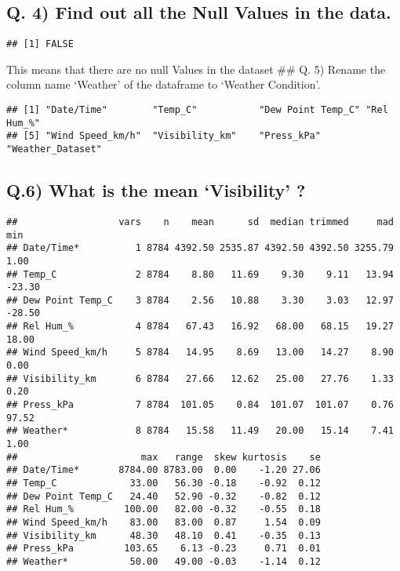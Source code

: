 \documentclass[
]{article}
\begin{document}
\hypertarget{q.-4-find-out-all-the-null-values-in-the-data.}{%
\subsection{Q. 4) Find out all the Null Values in the
data.}\label{q.-4-find-out-all-the-null-values-in-the-data.}}

\begin{verbatim}
## [1] FALSE
\end{verbatim}

This means that there are no null Values in the dataset \#\# Q. 5)
Rename the column name `Weather' of the dataframe to `Weather
Condition'.

\begin{verbatim}
## [1] "Date/Time"        "Temp_C"           "Dew Point Temp_C" "Rel Hum_%"       
## [5] "Wind Speed_km/h"  "Visibility_km"    "Press_kPa"        "Weather_Dataset"
\end{verbatim}

\hypertarget{q.6-what-is-the-mean-visibility}{%
\subsection{Q.6) What is the mean `Visibility'
?}\label{q.6-what-is-the-mean-visibility}}

\begin{verbatim}
##                  vars    n    mean      sd  median trimmed     mad    min
## Date/Time*          1 8784 4392.50 2535.87 4392.50 4392.50 3255.79   1.00
## Temp_C              2 8784    8.80   11.69    9.30    9.11   13.94 -23.30
## Dew Point Temp_C    3 8784    2.56   10.88    3.30    3.03   12.97 -28.50
## Rel Hum_%           4 8784   67.43   16.92   68.00   68.15   19.27  18.00
## Wind Speed_km/h     5 8784   14.95    8.69   13.00   14.27    8.90   0.00
## Visibility_km       6 8784   27.66   12.62   25.00   27.76    1.33   0.20
## Press_kPa           7 8784  101.05    0.84  101.07  101.07    0.76  97.52
## Weather*            8 8784   15.58   11.49   20.00   15.14    7.41   1.00
##                      max   range  skew kurtosis    se
## Date/Time*       8784.00 8783.00  0.00    -1.20 27.06
## Temp_C             33.00   56.30 -0.18    -0.92  0.12
## Dew Point Temp_C   24.40   52.90 -0.32    -0.82  0.12
## Rel Hum_%         100.00   82.00 -0.32    -0.55  0.18
## Wind Speed_km/h    83.00   83.00  0.87     1.54  0.09
## Visibility_km      48.30   48.10  0.41    -0.35  0.13
## Press_kPa         103.65    6.13 -0.23     0.71  0.01
## Weather*           50.00   49.00 -0.03    -1.14  0.12
\end{verbatim}
\end{document}
